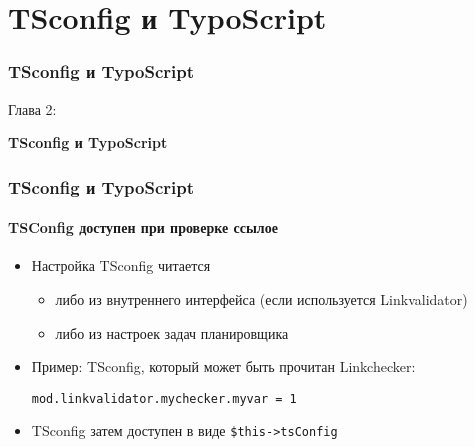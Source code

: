 %

\section{TSconfig и TypoScript}
\begin{frame}[fragile]
	\frametitle{TSconfig и TypoScript}

	\begin{center}\huge{Глава 2:}\end{center}
	\begin{center}\huge{\color{typo3darkgrey}\textbf{TSconfig и TypoScript}}\end{center}

\end{frame}


\begin{frame}[fragile]
	\frametitle{TSconfig и TypoScript}
	\framesubtitle{TSConfig доступен при проверке ссылое}

	\begin{itemize}
		\item Настройка TSconfig читается

			\begin{itemize}
				\item либо из внутреннего интерфейса (если используется Linkvalidator)
				\item либо из настроек задач планировщика
			\end{itemize}

		\item Пример: TSconfig, который может быть прочитан Linkchecker:

			\lstinline!mod.linkvalidator.mychecker.myvar = 1!

		\item TSconfig затем доступен в виде \texttt{\$this->tsConfig}
	\end{itemize}

\end{frame}

